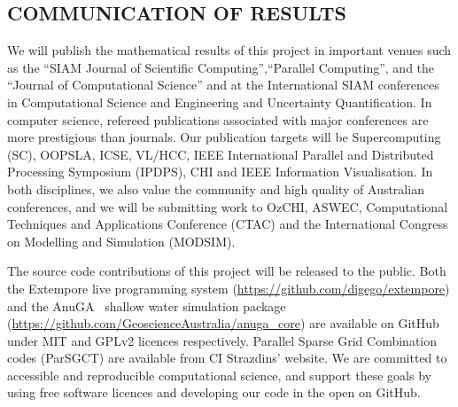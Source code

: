 \subsection*{COMMUNICATION OF RESULTS}


We will publish the mathematical results of this
project in important venues such as the ``SIAM Journal of
Scientific Computing'',``Parallel Computing'', and the ``Journal of
Computational Science'' and at the International SIAM conferences in Computational Science and Engineering and Uncertainty Quantification. 
In computer science, refereed publications
associated with major conferences are more prestigious than
journals. Our publication targets will be Supercomputing (SC), OOPSLA, ICSE, VL/HCC,
 IEEE International Parallel and Distributed
Processing Symposium (IPDPS), CHI and IEEE Information Visualisation. In both disciplines, we
also value the community and high quality of Australian conferences,
and we will be submitting work to OzCHI, ASWEC, Computational
Techniques and Applications Conference (CTAC) and the International 
Congress on Modelling and Simulation (MODSIM). 


The source code contributions of this project will be
released to the public. Both the Extempore live programming system
(\url{https://github.com/digego/extempore}) and the
 AnuGA~\parencite{anugamanual,nielsen2005hydrodynamic} 
shallow
water simulation package
(\url{https://github.com/GeoscienceAustralia/anuga_core}) are
available on GitHub under MIT and GPLv2 licences respectively.
Parallel Sparse Grid Combination codes (ParSGCT) are available from CI
Strazdins' website.  We are committed to accessible and reproducible
computational science, and support these goals by using free software
licences and developing our code in the open on GitHub.

